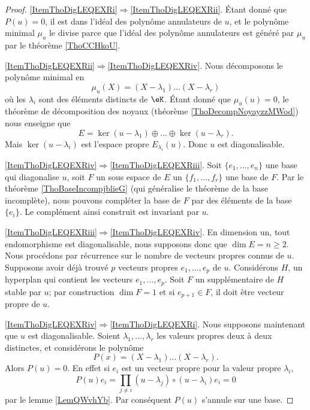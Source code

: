 \begin{proof}
    \ref{ItemThoDigLEQEXRi}\( \Rightarrow\)\ref{ItemThoDigLEQEXRii}. Étant donné que \( P(u)=0\), il est dans l'idéal des polynôme annulateurs de \( u\), et le polynôme minimal \( \mu_u\) le divise parce que l'idéal des polynôme annulateurs est généré par \( \mu_u\) par le théorème \ref{ThoCCHkoU}.

    \ref{ItemThoDigLEQEXRii}\( \Rightarrow\)\ref{ItemThoDigLEQEXRiv}. Nous décomposons le polynôme minimal en
    \begin{equation}
        \mu_u(X)=(X-\lambda_1)\ldots(X-\lambda_r)
    \end{equation}
    où les \( \lambda_i\) sont des éléments distincts de \( \eK\). Étant donné que \( \mu_u(u)=0\), le théorème de décomposition des noyaux (théorème \ref{ThoDecompNoyayzzMWod}) nous enseigne que
    \begin{equation}
        E=\ker(u-\lambda_1)\oplus\ldots\oplus\ker(u-\lambda_r).
    \end{equation}
    Mais \( \ker(u-\lambda_i)\) est l'espace propre \( E_{\lambda_i}(u)\). Donc \( u\) est diagonalisable.

    \ref{ItemThoDigLEQEXRiv}\( \Rightarrow\)\ref{ItemThoDigLEQEXRiii}. Soit \( \{ e_1,\ldots, e_n \}\) une base qui diagonalise \( u\), soit \( F\) un sous espace de \( E\) un \( \{ f_1,\ldots, f_r \}\) une base de \( F\). Par le théorème \ref{ThoBaseIncompjblieG} (qui généralise le théorème de la base incomplète), nous pouvons compléter la base de \( F\) par des éléments de la base \( \{ e_i \}\). Le complément ainsi construit est invariant par \( u\).

    \ref{ItemThoDigLEQEXRiii}\( \Rightarrow\)\ref{ItemThoDigLEQEXRiv}. En dimension un, tout endomorphisme est diagonalisable, nous supposons donc que \( \dim E=n\geq 2\). Nous procédons par récurrence sur le nombre de vecteurs propres connus de \( u\). Supposons avoir déjà trouvé \( p\) vecteurs propres \( e_1,\ldots, e_p\) de \( u\). Considérons \( H\), un hyperplan qui contient les vecteurs \( e_1,\ldots, e_p\). Soit \( F\) un supplémentaire de \( H\) stable par \( u\); par construction \( \dim F=1\) et si \( e_{p+1}\in F\), il doit être vecteur propre de \( u\).

    \ref{ItemThoDigLEQEXRiv}\( \Rightarrow\)\ref{ItemThoDigLEQEXRi}. Nous supposons maintenant que \( u\) est diagonalisable. Soient \( \lambda_1,\ldots, \lambda_r\) les valeurs propres deux à deux distinctes, et considérons le polynôme
    \begin{equation}
        P(x)=(X-\lambda_1)\ldots (X-\lambda_r).
    \end{equation}
    Alors \( P(u)=0\). En effet si \( e_i\) est un vecteur propre pour la valeur propre \( \lambda_i\), 
    \begin{equation}
        P(u)e_i=\prod_{j\neq i}(u-\lambda_j)\circ(u-\lambda_i)e_i=0
    \end{equation}
    par le lemme \ref{LemQWvhYb}. Par conséquent \( P(u)\) s'annule sur une base.
\end{proof}

